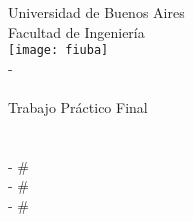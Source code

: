 \pagestyle{fancy}
\renewcommand{\sectionmark}[1]{\markboth{}{\thesection\ \ #1}}
\chead{}
\rhead{\rightmark}
\lfoot{}
\cfoot{}
\rfoot{\thepage}

\begin{titlepage}
\begin{center}
\LARGE{Universidad de Buenos Aires}\\
\LARGE{Facultad de Ingeniería}\\
\vspace{10mm}
\texttt{[image: fiuba]}\\
\vspace{10mm}
\LARGE{\codMateria - \nombreMateria}\\[0.5cm] 
\Large{\cuatrimestre}\\[4cm] 
\Large{Trabajo Práctico Final}\\[0.5cm]
\Large{\titulo}\\[4cm]
\large{\grupo} \\
\large{\nombreUno - \#\padronUno} \\
\large{\nombreDos - \#\padronDos} \\
\large{\nombreTres - \#\padronTres}\\

\end{center}
\end{titlepage}

\tableofcontents
\newpage
